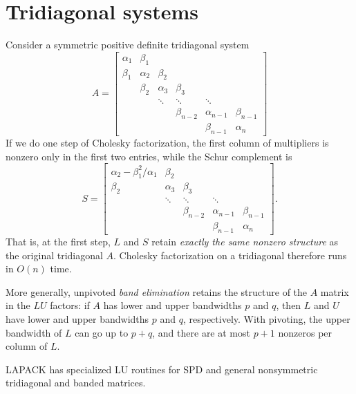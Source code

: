 \section{Tridiagonal systems}

Consider a symmetric positive definite tridiagonal system
\[
  A = \begin{bmatrix}
  \alpha_1 & \beta_1 \\
  \beta_1 & \alpha_2 & \beta_2 \\
  & \beta_2 & \alpha_3 & \beta_3 \\
  & & \ddots & \ddots & \ddots \\
  & & & \beta_{n-2} & \alpha_{n-1} & \beta_{n-1} \\
  & & & & \beta_{n-1} & \alpha_n
  \end{bmatrix}
\]
If we do one step of Cholesky factorization, the first column of
multipliers is nonzero only in the first two entries,
while the Schur complement is
\[
  S = \begin{bmatrix}
  \alpha_2-\beta_1^2/\alpha_1 & \beta_2 \\
  \beta_2 & \alpha_3 & \beta_3 \\
  & \ddots & \ddots & \ddots \\
  & & \beta_{n-2} & \alpha_{n-1} & \beta_{n-1} \\
  & & & \beta_{n-1} & \alpha_n
  \end{bmatrix}.
\]
That is, at the first step, $L$ and $S$ retain {\em exactly the same
nonzero structure} as the original tridiagonal $A$.  Cholesky
factorization on a tridiagonal therefore runs in $O(n)$ time.

More generally, unpivoted {\em band elimination} retains the structure
of the $A$ matrix in the $LU$ factors: if $A$ has lower and upper
bandwidths $p$ and $q$, then $L$ and $U$ have lower and upper
bandwidths $p$ and $q$, respectively.  With pivoting, the upper
bandwidth of $L$ can go up to $p+q$, and there are at most
$p+1$ nonzeros per column of $L$.

LAPACK has specialized LU routines for SPD and general nonsymmetric
tridiagonal and banded matrices.
